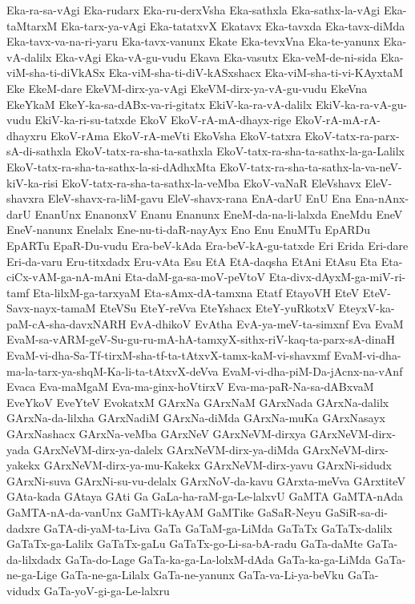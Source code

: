 {Eka-ra-sa-vAgi
Eka-rudarx
Eka-ru-derxVsha
Eka-sathxla
Eka-sathx-la-vAgi
Eka-taMtarxM
Eka-tarx-ya-vAgi
Eka-tatatxvX
Ekatavx
Eka-tavxda
Eka-tavx-diMda
Eka-tavx-va-na-ri-yaru
Eka-tavx-vanunx
Ekate
Eka-tevxVna
Eka-te-yanunx
Eka-vA-dalilx
Eka-vAgi
Eka-vA-gu-vudu
Ekava
Eka-vasutx
Eka-veM-de-ni-sida
Eka-viM-sha-ti-diVkASx
Eka-viM-sha-ti-diV-kASxshacx
Eka-viM-sha-ti-vi-KAyxtaM
Eke
EkeM-dare
EkeVM-dirx-ya-vAgi
EkeVM-dirx-ya-vA-gu-vudu
EkeVna
EkeYkaM
EkeY-ka-sa-dABx-va-ri-gitatx
EkiV-ka-ra-vA-dalilx
EkiV-ka-ra-vA-gu-vudu
EkiV-ka-ri-su-tatxde
EkoV
EkoV-rA-mA-dhayx-rige
EkoV-rA-mA-rA-dhayxru
EkoV-rAma
EkoV-rA-meVti
EkoVsha
EkoV-tatxra
EkoV-tatx-ra-parx-sA-di-sathxla
EkoV-tatx-ra-sha-ta-sathxla
EkoV-tatx-ra-sha-ta-sathx-la-ga-Lalilx
EkoV-tatx-ra-sha-ta-sathx-la-si-dAdhxMta
EkoV-tatx-ra-sha-ta-sathx-la-va-neV-kiV-ka-risi
EkoV-tatx-ra-sha-ta-sathx-la-veMba
EkoV-vaNaR
EleVshavx
EleV-shavxra
EleV-shavx-ra-liM-gavu
EleV-shavx-rana
EnA-darU
EnU
Ena
Ena-nAnx-darU
EnanUnx
EnanonxV
Enanu
Enanunx
EneM-da-na-li-lalxda
EneMdu
EneV
EneV-nanunx
Enelalx
Ene-nu-ti-daR-nayAyx
Eno
Enu
EnuMTu
EpARDu
EpARTu
EpaR-Du-vudu
Era-beV-kAda
Era-beV-kA-gu-tatxde
Eri
Erida
Eri-dare
Eri-da-varu
Eru-titxdadx
Eru-vAta
Esu
EtA
EtA-daqsha
EtAni
EtAsu
Eta
Eta-ciCx-vAM-ga-nA-mAni
Eta-daM-ga-sa-moV-peVtoV
Eta-divx-dAyxM-ga-miV-ri-tamf
Eta-lilxM-ga-tarxyaM
Eta-sAmx-dA-tamxna
Etatf
EtayoVH
EteV
EteV-Savx-nayx-tamaM
EteVSu
EteY-reVva
EteYshacx
EteY-yuRkotxV
EteyxV-ka-paM-cA-sha-davxNARH
EvA-dhikoV
EvAtha
EvA-ya-meV-ta-simxnf
Eva
EvaM
EvaM-sa-vARM-geV-Su-gu-ru-mA-hA-tamxyX-sithx-riV-kaq-ta-parx-sA-dinaH
EvaM-vi-dha-Sa-Tf-tirxM-sha-tf-ta-tAtxvX-tamx-kaM-vi-shavxmf
EvaM-vi-dha-ma-la-tarx-ya-shqM-Ka-li-ta-tAtxvX-deVva
EvaM-vi-dha-piM-Da-jAcnx-na-vAnf
Evaca
Eva-maMgaM
Eva-ma-ginx-hoVtirxV
Eva-ma-paR-Na-sa-dABxvaM
EveYkoV
EveYteV
EvokatxM
GArxNa
GArxNaM
GArxNada
GArxNa-dalilx
GArxNa-da-lilxha
GArxNadiM
GArxNa-diMda
GArxNa-muKa
GArxNasayx
GArxNashacx
GArxNa-veMba
GArxNeV
GArxNeVM-dirxya
GArxNeVM-dirx-yada
GArxNeVM-dirx-ya-dalelx
GArxNeVM-dirx-ya-diMda
GArxNeVM-dirx-yakekx
GArxNeVM-dirx-ya-mu-Kakekx
GArxNeVM-dirx-yavu
GArxNi-sidudx
GArxNi-suva
GArxNi-su-vu-delalx
GArxNoV-da-kavu
GArxta-meVva
GArxtiteV
GAta-kada
GAtaya
GAti
Ga
GaLa-ha-raM-ga-Le-lalxvU
GaMTA
GaMTA-nAda
GaMTA-nA-da-vanUnx
GaMTi-kAyAM
GaMTike
GaSaR-Neyu
GaSiR-sa-di-dadxre
GaTA-di-yaM-ta-Liva
GaTa
GaTaM-ga-LiMda
GaTaTx
GaTaTx-dalilx
GaTaTx-ga-Lalilx
GaTaTx-gaLu
GaTaTx-go-Li-sa-bA-radu
GaTa-daMte
GaTa-da-lilxdadx
GaTa-do-Lage
GaTa-ka-ga-La-lolxM-dAda
GaTa-ka-ga-LiMda
GaTa-ne-ga-Lige
GaTa-ne-ga-Lilalx
GaTa-ne-yanunx
GaTa-va-Li-ya-beVku
GaTa-vidudx
GaTa-yoV-gi-ga-Le-lalxru
}
